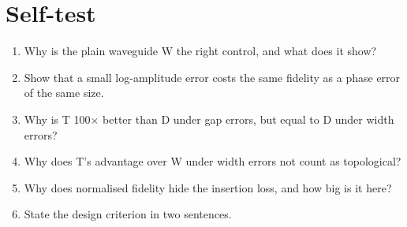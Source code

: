 \documentclass[10pt,a4paper]{article}
\begin{document}
\section{Self-test}
\begin{enumerate}[itemsep=1pt]
\item Why is the plain waveguide W the right control, and what does it show?
\item Show that a small log-amplitude error costs the same fidelity as a phase error of the same size.
\item Why is T 100$\times$ better than D under gap errors, but equal to D under width errors?
\item Why does T's advantage over W under width errors not count as topological?
\item Why does normalised fidelity hide the insertion loss, and how big is it here?
\item State the design criterion in two sentences.
\end{enumerate}
\end{document}
